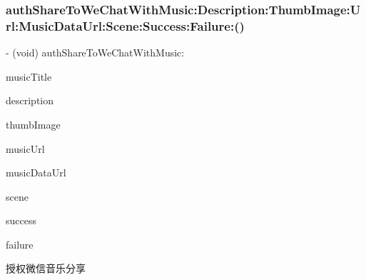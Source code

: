 \subsubsection{\texorpdfstring{auth\+Share\+To\+We\+Chat\+With\+Music\+:\+Description\+:\+Thumb\+Image\+:\+Url\+:\+Music\+Data\+Url\+:\+Scene\+:\+Success\+:\+Failure\+:()}{authShareToWeChatWithMusic:Description:ThumbImage:Url:MusicDataUrl:Scene:Success:Failure:()}}
{\footnotesize\ttfamily -\/ (void) auth\+Share\+To\+We\+Chat\+With\+Music\+: \begin{DoxyParamCaption}\item[{(N\+S\+String $\ast$)}]{music\+Title }\item[{Description:(N\+S\+String $\ast$)}]{description }\item[{ThumbImage:(U\+I\+Image $\ast$)}]{thumb\+Image }\item[{Url:(N\+S\+String $\ast$)}]{music\+Url }\item[{MusicDataUrl:(N\+S\+String $\ast$)}]{music\+Data\+Url }\item[{Scene:(Share\+To\+W\+X\+Scene)}]{scene }\item[{Success:(B\+Q\+L\+Auth\+Success\+Block)}]{success }\item[{Failure:(B\+Q\+L\+Auth\+Failure\+Block)}]{failure }\end{DoxyParamCaption}}

授权微信音乐分享


